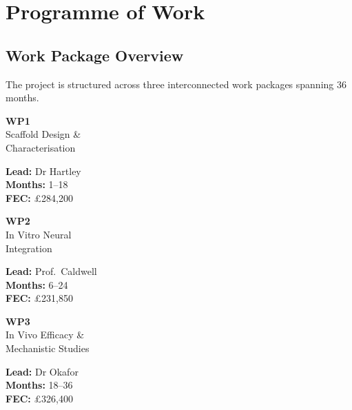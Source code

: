 \section{Programme of Work}

\subsection{Work Package Overview}

The project is structured across three interconnected work packages spanning 36 months.

\vspace{4pt}

\noindent
\begin{minipage}[t]{0.32\textwidth}
\begin{tcolorbox}[
  enhanced, sharp corners,
  colback=ukriblue, colframe=ukriblue,
  colupper=white, left=6pt, right=6pt, top=6pt, bottom=4pt,
  height=22mm
]
\centering
\textbf{WP1}\\[2pt]
\small Scaffold Design \&\\Characterisation
\end{tcolorbox}
\begin{tcolorbox}[highlightbox, top=4pt, bottom=4pt]
\scriptsize
\textbf{Lead:} Dr Hartley\\
\textbf{Months:} 1--18\\
\textbf{FEC:} \pounds 284,200
\end{tcolorbox}
\end{minipage}%
\hfill
\begin{minipage}[t]{0.32\textwidth}
\begin{tcolorbox}[
  enhanced, sharp corners,
  colback=ukripink, colframe=ukripink,
  colupper=white, left=6pt, right=6pt, top=6pt, bottom=4pt,
  height=22mm
]
\centering
\textbf{WP2}\\[2pt]
\small In Vitro Neural\\Integration
\end{tcolorbox}
\begin{tcolorbox}[highlightbox, top=4pt, bottom=4pt]
\scriptsize
\textbf{Lead:} Prof.\ Caldwell\\
\textbf{Months:} 6--24\\
\textbf{FEC:} \pounds 231,850
\end{tcolorbox}
\end{minipage}%
\hfill
\begin{minipage}[t]{0.32\textwidth}
\begin{tcolorbox}[
  enhanced, sharp corners,
  colback=ukricyan, colframe=ukricyan,
  colupper=white, left=6pt, right=6pt, top=6pt, bottom=4pt,
  height=22mm
]
\centering
\textbf{WP3}\\[2pt]
\small In Vivo Efficacy \&\\Mechanistic Studies
\end{tcolorbox}
\begin{tcolorbox}[highlightbox, top=4pt, bottom=4pt]
\scriptsize
\textbf{Lead:} Dr Okafor\\
\textbf{Months:} 18--36\\
\textbf{FEC:} \pounds 326,400
\end{tcolorbox}
\end{minipage}

